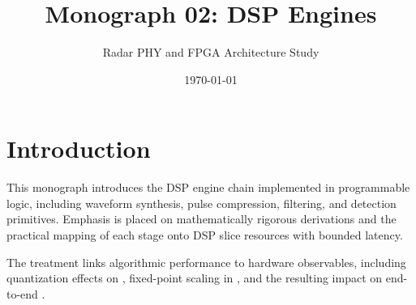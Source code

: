 \documentclass[11pt]{article}
\title{Monograph 02: DSP Engines}
\author{Radar PHY and FPGA Architecture Study}
\date{\today}
\begin{document}
\maketitle

\section{Introduction}
This monograph introduces the DSP engine chain implemented in programmable logic, including waveform synthesis, pulse compression, filtering, and detection primitives. Emphasis is placed on mathematically rigorous derivations and the practical mapping of each stage onto DSP slice resources with bounded latency.

The treatment links algorithmic performance to hardware observables, including quantization effects on \SNR, fixed-point scaling in \dBFS, and the resulting impact on end-to-end \ENOB.



\end{document}
